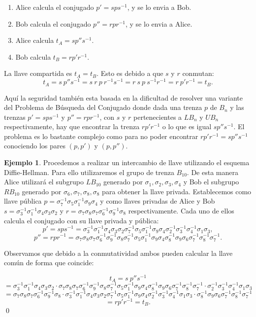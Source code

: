 \documentclass[12pt]{article}
\theoremstyle{definition}
\newtheorem{ejem}{Ejemplo}[section]
\begin{document}
\begin{enumerate}
\item Alice calcula el conjugado $p'=sps^{-1}$, y se lo envia a Bob.
\item Bob calcula el conjugado $p''=rpr^{-1}$, y se lo envia a Alice.
\item Alice calcula $t_A = sp''s^{-1}$.
\item Bob calcula $t_B = rp'r^{-1}$. 
\end{enumerate}

La llave compartida es $t_A = t_B$. Esto es debido a que $s$ y $r$ conmutan:
$$t_A=s\ p''s^{-1}=s\ r\ p\ r^{-1}s^{-1} = r\ s\ p\ s^{-1}r^{-1} = r\ p'r^{-1}=t_B.$$

Aquí la seguridad también esta basada en la dificultad de resolver una variante del Problema de Búsqueda del Conjugado donde dada una trenza $p$ de $B_n$ y las trenzas $p'=sps^{-1}$ y $p''=rpr^{-1}$, con $s$ y $r$ pertenecientes a $LB_n$ y $UB_n$ respectivamente, hay que encontrar la trenza $rp'r^{-1}$ o lo que es igual $sp''s^{-1}$. El problema es lo bastante complejo como para no poder encontrar $rp'r^{-1}=sp''s^{-1}$ conociendo los pares $(p,p')$ y $(p,p'')$.

\begin{ejem}
Procedemos a realizar un intercambio de llave utilizando el esquema Diffie-Hellman. Para ello utilizaremos el grupo de trenza $B_{10}$. De esta manera Alice utilizará el subgrupo $LB_{10}$ generado por $\sigma_1,\sigma_2,\sigma_3,\sigma_4$ y Bob el subgrupo $RB_{10}$ generado por $\sigma_6,\sigma_7,\sigma_8,\sigma_8$ para obtener la llave privada. Establecemos como llave pública $p=\sigma_7^{-1}\sigma_5\sigma_1^{-1}\sigma_9\sigma_4$ y como llaves privadas de Alice y Bob $s = \sigma_3^{-1}\sigma_1^{-1}\sigma_4\sigma_3\sigma_2$ y $r = \sigma_7\sigma_8\sigma_7\sigma_6^{-1}\sigma_9^{-1}\sigma_8$ respectivamente. Cada uno de ellos calcula el conjugado con su llave privada y pública:
$$p' = sps^{-1}=\sigma_3^{-1}\sigma_1^{-1}\sigma_4\sigma_3\sigma_2 \sigma_7^{-1}\sigma_5\sigma_1^{-1}\sigma_9\sigma_4 \sigma_2^{-1}\sigma_3^{-1}\sigma_4^{-1}\sigma_1\sigma_3,$$
$$p'' = rpr^{-1} = \sigma_7\sigma_8\sigma_7\sigma_6^{-1}\sigma_9^{-1}\sigma_8 \sigma_7^{-1}\sigma_5\sigma_1^{-1}\sigma_9\sigma_4 \sigma_8^{-1}\sigma_9\sigma_6\sigma_7^{-1}\sigma_8^{-1}\sigma_7^{-1}.$$


Observamos que debido a la conmutatividad ambos pueden calcular la llave común de forma que coincide:

$$t_A = s\ p''s^{-1} $$$$= \sigma_3^{-1}\sigma_1^{-1}\sigma_4\sigma_3\sigma_2\cdot \sigma_7\sigma_8\sigma_7\sigma_6^{-1}\sigma_9^{-1}\sigma_8 \sigma_7^{-1}\sigma_5\sigma_1^{-1}\sigma_9\sigma_4 \sigma_8^{-1}\sigma_9\sigma_6\sigma_7^{-1}\sigma_8^{-1}\sigma_7^{-1}\cdot\sigma_2^{-1}\sigma_3^{-1}\sigma_4^{-1}\sigma_1\sigma_3$$
$$=\sigma_7\sigma_8\sigma_7\sigma_6^{-1}\sigma_9^{-1}\sigma_8\cdot \sigma_3^{-1}\sigma_1^{-1}\sigma_4\sigma_3\sigma_2 \sigma_7^{-1}\sigma_5\sigma_1^{-1}\sigma_9\sigma_4 \sigma_2^{-1}\sigma_3^{-1}\sigma_4^{-1}\sigma_1\sigma_3\cdot
\sigma_8^{-1}\sigma_9\sigma_6\sigma_7^{-1}\sigma_8^{-1}\sigma_7^{-1} $$
$$= rp'r^{-1} = t_B.$$ \qed
\end{ejem}
\end{document}

